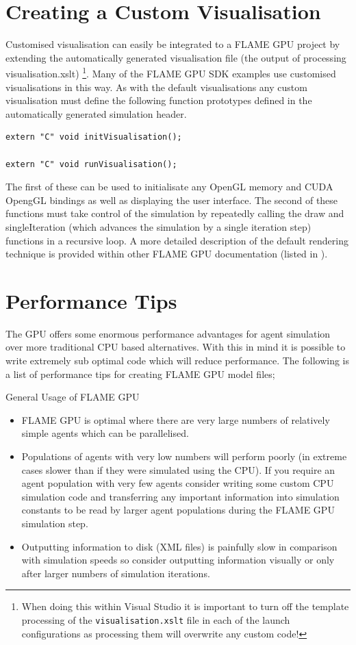 \documentclass[11pt, a4paper, onecolumn, oneside]{report}
\begin{document}
\section{Creating a Custom Visualisation}
\label{sec:46}


Customised visualisation can easily be integrated to a FLAME GPU project by extending the automatically generated visualisation file (the output of processing visualisation.xslt)
\footnote{When doing this within Visual Studio it is important to turn off the template processing of the \texttt{visualisation.xslt} file in each of the launch configurations as processing them will overwrite any custom code!}.
Many of the FLAME GPU SDK examples use customised visualisations in this way.
As with the default visualisations any custom visualisation must define the following function prototypes defined in the automatically generated simulation header.

\begin{lstlisting}[language=C_]
extern "C" void initVisualisation();

extern "C" void runVisualisation();
\end{lstlisting}


The first of these can be used to initialisate any OpenGL memory and CUDA OpengGL bindings as well as displaying the user interface.
The second of these functions must take control of the simulation by repeatedly calling the draw and singleIteration (which advances the simulation by a single iteration step) functions in a recursive loop.
A more detailed description of the default rendering technique is provided within other FLAME GPU documentation (listed in ).

\section{Performance Tips}
\label{sec:47}


The GPU offers some enormous performance advantages for agent simulation over more traditional CPU based alternatives.
With this in mind it is possible to write extremely sub optimal code which will reduce performance.
The following is a list of performance tips for creating FLAME GPU model files;

General Usage of FLAME GPU
\begin{itemize}
    \item FLAME GPU is optimal where there are very large numbers of relatively simple agents which can be parallelised.
    \item Populations of agents with very low numbers will perform poorly (in extreme cases slower than if they were simulated using the CPU).
        If you require an agent population with very few agents consider writing some custom CPU simulation code and transferring any important information into simulation constants to be read by larger agent populations during the FLAME GPU simulation step.
    \item Outputting information to disk (XML files) is painfully slow in comparison with simulation speeds so consider outputting information visually or only after larger numbers of simulation iterations.
\end{itemize}
\end{document}
